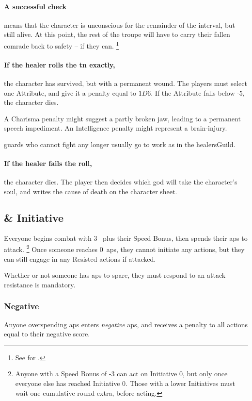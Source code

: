 \begin{multicols}{2}
\paragraph{A successful check}
means that the character is unconscious for the remainder of the \gls{interval}, but still alive.
At this point, the rest of the troupe will have to carry their fallen comrade back to safety -- if they can.%
\footnote{See  for .}

\paragraph{If the healer rolls the \gls{tn} exactly,}
the character has survived, but with a permanent wound.
The players must select one Attribute, and give it a penalty equal to $1D6$.
If the Attribute falls below -5, the character dies.

A Charisma penalty might suggest a partly broken jaw, leading to a permanent speech impediment.
An Intelligence penalty might represent a brain-injury.

\Glspl{guard} who cannot fight any longer usually go to work as  in the \gls{healersGuild}.

\paragraph{If the healer fails the roll,}
the character dies.
The player then decides which god will take the character's soul, and writes the cause of death on the character sheet.

\subsection{ \& Initiative}
\label{actionPoints}

Everyone begins combat with 3~ plus their Speed Bonus, then spends their \glspl{ap} to attack.%
\footnote{Anyone with a Speed Bonus of -3 can act on Initiative 0, but only once everyone else has reached Initiative 0.
Those with a lower Initiatives must wait one cumulative round extra, before acting.}
Once someone reaches 0~\glspl{ap}, they cannot initiate any actions, but they can still engage in any Resisted actions if attacked.

Whether or not someone has \glspl{ap} to spare, they must respond to an attack -- resistance is mandatory.

\subsubsection{Negative }
Anyone overspending \glspl{ap} enters \emph{negative} \glspl{ap}, and receives a penalty to all actions equal to their negative score.


\end{multicols}
